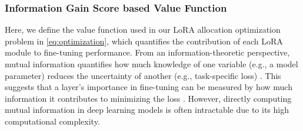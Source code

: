 \documentclass[sigconf]{acmart}
\begin{document}


\subsubsection{Information Gain Score based Value Function}\label{sec:IGScore}

Here, we define the value function used in our LoRA allocation optimization problem in \eqref{eq:optimization}, which quantifies the contribution of each LoRA module to fine-tuning performance.
% 
From an information-theoretic perspective, mutual information quantifies how much knowledge of one variable (e.g., a model parameter) reduces the uncertainty of another (e.g., task-specific loss) \cite{kullback1997information}. This suggests that a layer's importance in fine-tuning can be measured by how much information it contributes to minimizing the loss \cite{gabrie2018entropy}. However, directly computing mutual information in deep learning models is often intractable due to its high computational complexity.
\end{document}
